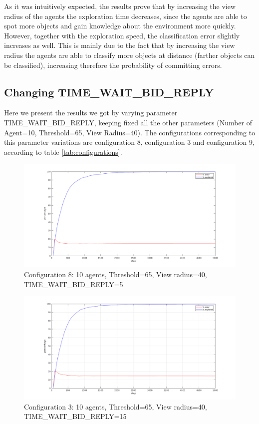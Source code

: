\documentclass[a4paper, 10pt, conference]{ieeeconf}      %
\begin{document}
As it was intuitively expected, the results prove that by increasing the view radius of the agents the exploration time decreases, since the agents are able to spot more objects and gain knowledge about the environment more quickly. However, together with the exploration speed, the classification error slightly increases as well. This is mainly due to the fact that by increasing the view radius the agents are able to classify more objects at distance (farther objects can be classified), increasing therefore the probability of committing errors. 

\subsection{Changing TIME\_WAIT\_BID\_REPLY}
Here we present the results we got by varying parameter TIME\_WAIT\_BID\_REPLY, keeping fixed all the other parameters (Number of Agent=10, Threshold=65, View Radius=40). The configurations corresponding to this parameter variations are configuration 8, configuration 3 and configuration 9, according to table \ref{tab:configurations}. 
\begin{figure}[H]
	\centering
	\includegraphics[width=1\linewidth]{img/config8.png}
	\caption{Configuration 8: 10 agents, Threshold=65, View radius=40, TIME\_WAIT\_BID\_REPLY=5}
	\label{fig:config8}
\end{figure}
\begin{figure}[H]
	\centering
	\includegraphics[width=1\linewidth]{img/config3.png}
	\caption{Configuration 3: 10 agents, Threshold=65, View radius=40, TIME\_WAIT\_BID\_REPLY=15}
	\label{fig:config3}
\end{figure}
\end{document}
